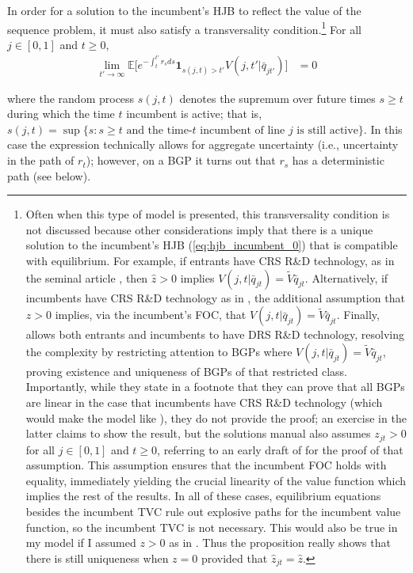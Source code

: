 \documentclass[11pt,english]{article}
\begin{document}
In order for a solution to the incumbent's HJB to reflect the value of the sequence problem, it must also satisfy a transversality condition.\footnote{Often when this type of model is presented, this transversality condition is not discussed because other considerations imply that there is a unique solution to the incumbent's HJB (\ref{eq:hjb_incumbent_0}) that is compatible with equilibrium. For example, if entrants have CRS R\&D technology, as in the seminal article \cite{grossman_quality_1991}, then $\hat{z} > 0$ implies $V(j,t|\bar{q}_{jt}) = \tilde{V} \bar{q}_{jt}$. Alternatively, if incumbents have CRS R\&D technology as in \cite{acemoglu_introduction_2009}, the additional assumption that $z > 0$ implies, via the incumbent's FOC, that $V(j,t|\bar{q}_{jt}) = \tilde{V} \bar{q}_{jt}$. Finally, \cite{acemoglu_innovation_2015} allows both entrants and incumbents to have DRS R\&D technology, resolving the complexity by restricting attention to BGPs where $V(j,t|\bar{q}_{jt}) = \tilde{V} \bar{q}_{jt}$, proving existence and uniqueness of BGPs of that restricted class. Importantly, while they state in a footnote that they can prove that all BGPs are linear in the case that incumbents have CRS R\&D technology (which would make the model like \cite{acemoglu_introduction_2009}), they do not provide the proof; an exercise in the latter claims to show the result, but the solutions manual also assumes $z_{jt} > 0$ for all $j \in [0,1]$ and $t \ge 0$, referring to an early draft of \cite{acemoglu_introduction_2009} for the proof of that assumption. This assumption ensures that the incumbent FOC holds with equality, immediately yielding the crucial linearity of the value function which implies the rest of the results. In all of these cases, equilibrium equations besides the incumbent TVC rule out explosive paths for the incumbent value function, so the incumbent TVC is not necessary. This would also be true in my model if I assumed $z > 0$ as in \cite{acemoglu_introduction_2009}. Thus the proposition really shows that there is still uniqueness when $z = 0$ provided that $\hat{z}_{jt} = \hat{z}$.} For all $j \in [0,1]$ and $t \ge 0$,
\begin{align}
\lim_{t' \to \infty} \mathbb{E} \Big[ e^{-\int_t^{t'} r_s ds} \mathbf{1}_{s(j,t) > t'} V(j,t'|\bar{q}_{jt'}) \Big] &= 0 \label{eq:tvc_incumbent}
\end{align} 

where the random process $s(j,t)$ denotes the supremum over future times $s \ge t$ during which the time $t$ incumbent is active; that is, $s(j,t) = \sup\{ s : s \ge t \text{ and the time-} t \text{ incumbent of line } j \text{ is still active}\}$. In this case the expression technically allows for aggregate uncertainty (i.e., uncertainty in the path of $r_t$); however, on a BGP it turns out that $r_s$ has a deterministic path (see below). 
\end{document}
